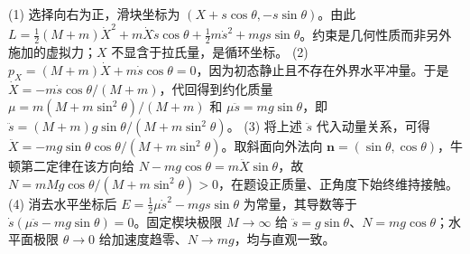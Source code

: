(1) 选择向右为正，滑块坐标为 \((X+s\cos\theta,-s\sin\theta)\)。由此 \(L=\frac12(M+m)\dot X^2+m\dot X\dot s\cos\theta+\frac12m\dot s^2+mg s\sin\theta\)。约束是几何性质而非另外施加的虚拟力；\(X\) 不显含于拉氏量，是循环坐标。
(2) \(p_X=(M+m)\dot X+m\dot s\cos\theta=0\)，因为初态静止且不存在外界水平冲量。于是 \(\dot X=-m\dot s\cos\theta/(M+m)\)，代回得到约化质量 \(\mu=m(M+m\sin^2\theta)/(M+m)\) 和 \(\mu\ddot s=mg\sin\theta\)，即 \(\ddot s=(M+m)g\sin\theta/(M+m\sin^2\theta)\)。
(3) 将上述 \(\ddot s\) 代入动量关系，可得 \(\ddot X=-mg\sin\theta\cos\theta/(M+m\sin^2\theta)\)。取斜面向外法向 \(\mathbf n=(\sin\theta,\cos\theta)\)，牛顿第二定律在该方向给 \(N-mg\cos\theta=m\ddot X\sin\theta\)，故 \(N=mMg\cos\theta/(M+m\sin^2\theta)>0\)，在题设正质量、正角度下始终维持接触。
(4) 消去水平坐标后 \(E=\frac12\mu\dot s^2-mgs\sin\theta\) 为常量，其导数等于 \(\dot s(\mu\ddot s-mg\sin\theta)=0\)。固定楔块极限 \(M\to\infty\) 给 \(\ddot s=g\sin\theta\)、\(N=mg\cos\theta\)；水平面极限 \(\theta\to0\) 给加速度趋零、\(N\to mg\)，均与直观一致。
